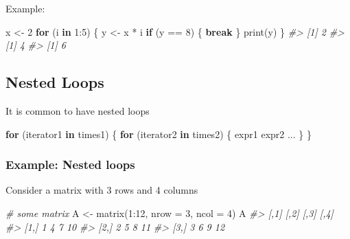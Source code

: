 \documentclass[
]{book}
\newenvironment{Shaded}{\begin{snugshade}}{\end{snugshade}}
\newcommand{\AttributeTok}[1]{\textcolor[rgb]{0.77,0.63,0.00}{#1}}
\newcommand{\CommentTok}[1]{\textcolor[rgb]{0.56,0.35,0.01}{\textit{#1}}}
\newcommand{\ControlFlowTok}[1]{\textcolor[rgb]{0.13,0.29,0.53}{\textbf{#1}}}
\newcommand{\DecValTok}[1]{\textcolor[rgb]{0.00,0.00,0.81}{#1}}
\newcommand{\FunctionTok}[1]{\textcolor[rgb]{0.00,0.00,0.00}{#1}}
\newcommand{\NormalTok}[1]{#1}
\newcommand{\OtherTok}[1]{\textcolor[rgb]{0.56,0.35,0.01}{#1}}
\newcommand{\SpecialCharTok}[1]{\textcolor[rgb]{0.00,0.00,0.00}{#1}}
\begin{document}
Example:

\begin{Shaded}
\begin{Highlighting}[]
\NormalTok{x }\OtherTok{\textless{}{-}} \DecValTok{2}
\ControlFlowTok{for}\NormalTok{ (i }\ControlFlowTok{in} \DecValTok{1}\SpecialCharTok{:}\DecValTok{5}\NormalTok{) \{}
\NormalTok{  y }\OtherTok{\textless{}{-}}\NormalTok{ x }\SpecialCharTok{*}\NormalTok{ i}
  \ControlFlowTok{if}\NormalTok{ (y }\SpecialCharTok{==} \DecValTok{8}\NormalTok{) \{}
    \ControlFlowTok{break}
\NormalTok{  \}}
  \FunctionTok{print}\NormalTok{(y)}
\NormalTok{\}}
\CommentTok{\#\textgreater{} [1] 2}
\CommentTok{\#\textgreater{} [1] 4}
\CommentTok{\#\textgreater{} [1] 6}
\end{Highlighting}
\end{Shaded}

\hypertarget{nested-loops}{%
\subsection{Nested Loops}\label{nested-loops}}

It is common to have nested loops

\begin{Shaded}
\begin{Highlighting}[]
\ControlFlowTok{for}\NormalTok{ (iterator1 }\ControlFlowTok{in}\NormalTok{ times1) \{ }
  \ControlFlowTok{for}\NormalTok{ (iterator2 }\ControlFlowTok{in}\NormalTok{ times2) \{}
\NormalTok{    expr1}
\NormalTok{    expr2}
\NormalTok{    ...}
\NormalTok{  \}}
\NormalTok{\}}
\end{Highlighting}
\end{Shaded}

\hypertarget{example-nested-loops}{%
\subsubsection*{Example: Nested loops}\label{example-nested-loops}}

Consider a matrix with 3 rows and 4 columns

\begin{Shaded}
\begin{Highlighting}[]
\CommentTok{\# some matrix}
\NormalTok{A }\OtherTok{\textless{}{-}} \FunctionTok{matrix}\NormalTok{(}\DecValTok{1}\SpecialCharTok{:}\DecValTok{12}\NormalTok{, }\AttributeTok{nrow =} \DecValTok{3}\NormalTok{, }\AttributeTok{ncol =} \DecValTok{4}\NormalTok{)}
\NormalTok{A}
\CommentTok{\#\textgreater{}      [,1] [,2] [,3] [,4]}
\CommentTok{\#\textgreater{} [1,]    1    4    7   10}
\CommentTok{\#\textgreater{} [2,]    2    5    8   11}
\CommentTok{\#\textgreater{} [3,]    3    6    9   12}
\end{Highlighting}
\end{Shaded}
\end{document}
